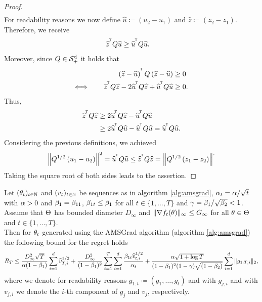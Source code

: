 \begin{proof}
\begin{align*}
\end{align*}
For readability reasons we now define $\hat{u} \coloneqq (u_2 - u_1)$ and $\hat{z} \coloneqq (z_2 - z_1)$. Therefore, we receive
\begin{align*}
&\widehat{z}^{^{\mkern-1.5mu\mathsf{T}}} Q \widehat{u} \geq \widehat{u}^{^{\mkern-1.5mu\mathsf{T}}} Q\widehat{u}.
\end{align*}
Moreover, since $Q\in\operatorname{\mathcal{S}^d_{+}}$ it holds that
\begin{align*}
\left(\widehat{z} - \widehat{u}\right)^{^{\mkern-1.5mu\mathsf{T}}}Q\left(\widehat{z} - \widehat{u}\right) &\geq 0\\
\Longleftrightarrow \qquad \widehat{z}^{^{\mkern-1.5mu\mathsf{T}}}Q\widehat{z} - 2 \widehat{u}^{^{\mkern-1.5mu\mathsf{T}}}Q\widehat{z} + \widehat{u}^{^{\mkern-1.5mu\mathsf{T}}}Q\widehat{u} &\geq 0.
\end{align*}
Thus,
\begin{align*}
\widehat{z}^{^{\mkern-1.5mu\mathsf{T}}}Q\widehat{z} &\geq 2 \widehat{u}^{^{\mkern-1.5mu\mathsf{T}}}Q\widehat{z} - \widehat{u}^{^{\mkern-1.5mu\mathsf{T}}}Q\widehat{u}\\
& \geq 2 \widehat{u}^{^{\mkern-1.5mu\mathsf{T}}}Q\widehat{u} - \widehat{u}^{^{\mkern-1.5mu\mathsf{T}}}Q\widehat{u} = \widehat{u}^{^{\mkern-1.5mu\mathsf{T}}}Q\widehat{u}.
\end{align*}
Considering the previous definitions, we achieved
\begin{align*}
\left\| Q^{1/2} \left( u_1 - u_2 \right) \right\|^2 = \widehat{u}^{^{\mkern-1.5mu\mathsf{T}}}Q \widehat{u} \leq \widehat{z}^{^{\mkern-1.5mu\mathsf{T}}}Q\widehat{z} = \left\| Q^{1/2} \left( z_1 - z_2 \right) \right\|^.
\end{align*}
Taking the square root of both sides leads to the assertion.
\end{proof}

\begin{theorem}\label{theorem:amsgrad}
Let $(\theta_t)_{t\in\operatorname{\mathbb{N}}}$ and $(v_t)_{t\in\operatorname{\mathbb{N}}}$ be sequences as in algorithm \ref{alg:amsgrad}, $\alpha_t = \alpha/\sqrt{t}$ with $\alpha>0$ and $\beta_1 = \beta_{11}$, $\beta_{1t}\leq \beta_1$ for all $t \in \{1,\ldots, T\}$ and $\operatorname{\gamma} = \beta_1/\sqrt{\beta_{2}} < 1$. Assume that $\operatorname{\Theta}$ has bounded diameter $D_{\infty}$ and $\|\nabla f_t(\theta)\|_{\infty}\leq G_{\infty}$ for all $\theta\in\operatorname{\Theta}$ and $t \in \{1,\ldots, T\}$.\\
Then for $\theta_t$ generated using the AMSGrad algorithm (algorithm \ref{alg:amsgrad}) the following bound for the regret holds
\begin{align*}
R_T \leq \frac{D_{\infty}^2\sqrt{T}}{\alpha(1-\beta_1)} \sum_{i=1}^d \widehat{v}_{T,i}^{1/2} + \frac{D_{\infty}^2}{(1-\beta_1)^2} \sum_{t=1}^T \sum_{i=1}^d \frac{\beta_{1t}\widehat{v}_{t,i}^{1/2}}{\alpha_t}+ \frac{\alpha\sqrt{1 + \log T}}{(1-\beta_1)^2(1-\operatorname{\gamma})\sqrt{(1-\beta_2)}}\sum_{i=1}^d \|g_{1:T,i}\|_2,
\end{align*}
where we denote for readability reasons $g_{1:t}\coloneqq(g_1,\ldots, g_t)$ and with $g_{j,i}$ and with $v_{j,i}$ we denote the $i$-th component of $g_j$ and $v_j$, respectively.
\end{theorem}

